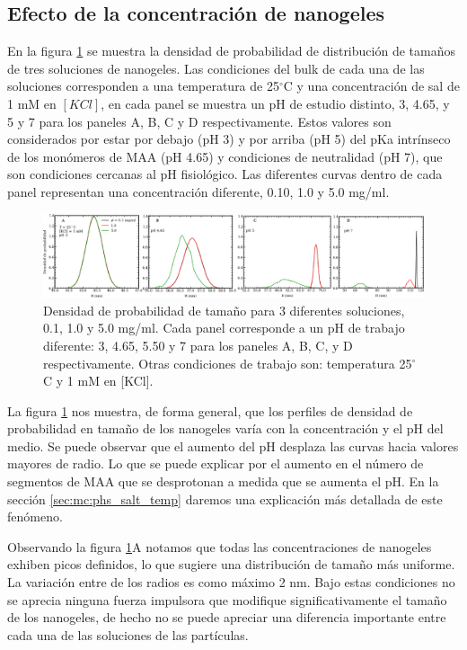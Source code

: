 	
	
	\subsection{Efecto de la concentraci\'on de nanogeles}
	En la figura \ref{fig:mc:densidad-probabilidad} se muestra la densidad de probabilidad de distribuci\'on de tama\~nos de tres soluciones de nanogeles. Las condiciones del bulk de cada una de las soluciones corresponden a una temperatura de 25$^\circ$C y una concentraci\'on de sal de 1 mM en $[KCl]$, en cada panel se muestra un pH de estudio distinto, 3, 4.65, y 5 y 7 para los paneles A, B, C y D respectivamente. Estos valores son considerados por estar por debajo (pH 3) y por arriba (pH 5) del pKa intr\'inseco de los mon\'omeros de MAA (pH 4.65) y condiciones de neutralidad (pH 7), que son condiciones cercanas al pH fisiol\'ogico. Las diferentes curvas dentro de cada panel representan una concentraci\'on diferente, 0.10, 1.0 y 5.0 mg/ml.
	
	\begin{figure}
		\centering
		\includegraphics[width=0.99\linewidth]{Figures/graph-mc/sizes-phs.pdf}
		\caption{Densidad de probabilidad de tama\~no para 3 diferentes soluciones, 0.1, 1.0 y 5.0 mg/ml. Cada panel corresponde a un pH de trabajo diferente: 3, 4.65, 5.50 y 7 para los paneles A, B, C, y D respectivamente. Otras condiciones de trabajo son: temperatura 25$^\circ$C y 1 mM en [KCl].}
		\label{fig:mc:densidad-probabilidad}
	\end{figure}
	
	La figura \ref{fig:mc:densidad-probabilidad} nos muestra, de forma general, que los perfiles de densidad de probabilidad en tama\~no de los nanogeles var\'ia con la concentraci\'on y el pH del medio. Se puede observar que el aumento del pH desplaza las curvas hacia valores mayores de radio. Lo que se puede explicar por el aumento en el n\'umero de segmentos de MAA que se desprotonan a medida que se aumenta el pH. En la secci\'on \ref{sec:mc:phs_salt_temp} daremos una explicaci\'on m\'as detallada de este fen\'omeno.
	
	Observando la figura \ref{fig:mc:densidad-probabilidad}A notamos que todas las concentraciones de nanogeles exhiben picos definidos, lo que sugiere una distribuci\'on de tama\~no m\'as uniforme. La variaci\'on entre de los radios es como m\'aximo 2 nm. Bajo estas condiciones no se aprecia ninguna fuerza impulsora que modifique significativamente el tama\~no de los nanogeles, de hecho no se puede apreciar una diferencia importante entre cada una de las soluciones de las part\'iculas.
	

